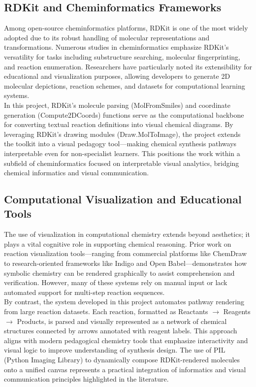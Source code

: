 \documentclass[12pt]{article}
\begin{document}
\subsection{RDKit and Cheminformatics Frameworks}
\indent
Among open-source cheminformatics platforms, RDKit is one of the most widely adopted due to its robust handling of molecular representations and transformations. 
Numerous studies in cheminformatics emphasize RDKit’s versatility for tasks including substructure searching, molecular fingerprinting, and reaction enumeration.
Researchers have particularly noted its extensibility for educational and visualization purposes, allowing developers to generate 2D molecular depictions, reaction schemes, and datasets for computational learning systems.
\\
\indent
In this project, RDKit’s molecule parsing (MolFromSmiles) and coordinate generation (Compute2DCoords) functions serve as the computational backbone for converting textual reaction definitions into visual chemical diagrams.
By leveraging RDKit’s drawing modules (Draw.MolToImage), the project extends the toolkit into a visual pedagogy tool—making chemical synthesis pathways interpretable even for non-specialist learners.
This positions the work within a subfield of cheminformatics focused on interpretable visual analytics, bridging chemical informatics and visual communication.
\\
\subsection{Computational Visualization and Educational Tools}
\indent
The use of visualization in computational chemistry extends beyond aesthetics; it plays a vital cognitive role in supporting chemical reasoning.
Prior work on reaction visualization tools—ranging from commercial platforms like ChemDraw to research-oriented frameworks like Indigo and Open Babel—demonstrates how symbolic chemistry can be rendered graphically to assist comprehension and verification.
However, many of these systems rely on manual input or lack automated support for multi-step reaction sequences.
\\
\indent
By contrast, the system developed in this project automates pathway rendering from large reaction datasets. 
Each reaction, formatted as Reactants $\rightarrow$ Reagents $\rightarrow$ Products, is parsed and visually represented as a network of chemical structures connected by arrows annotated with reagent labels.
This approach aligns with modern pedagogical chemistry tools that emphasize interactivity and visual logic to improve understanding of synthesis design.
The use of PIL (Python Imaging Library) to dynamically compose RDKit-rendered molecules onto a unified canvas represents a practical integration of informatics and visual communication principles highlighted in the literature.
\\
\end{document}
